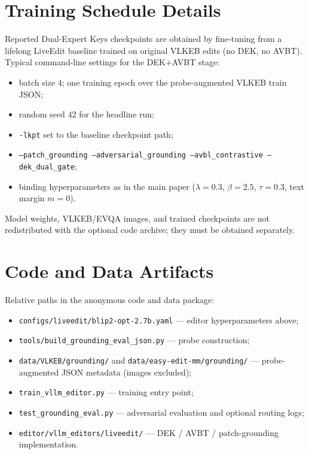 \documentclass[letterpaper]{article}
\begin{document}
\section{Training Schedule Details}
Reported Dual-Expert Keys checkpoints are obtained by fine-tuning from a lifelong LiveEdit baseline trained on original VLKEB edits (no DEK, no AVBT).
Typical command-line settings for the DEK+AVBT stage:
\begin{itemize}
\item batch size $4$; one training epoch over the probe-augmented VLKEB train JSON;
\item random seed $42$ for the headline run;
\item \texttt{-lkpt} set to the baseline checkpoint path;
\item \texttt{--patch\_grounding --adversarial\_grounding --avbl\_contrastive --dek\_dual\_gate};
\item binding hyperparameters as in the main paper ($\lambda{=}0.3$, $\beta{=}2.5$, $\tau{=}0.3$, text margin $m{=}0$).
\end{itemize}
Model weights, VLKEB/EVQA images, and trained checkpoints are not redistributed with the optional code archive; they must be obtained separately.

\section{Code and Data Artifacts}
Relative paths in the anonymous code and data package:
\begin{itemize}
\item \texttt{configs/liveedit/blip2-opt-2.7b.yaml} --- editor hyperparameters above;
\item \texttt{tools/build\_grounding\_eval\_json.py} --- probe construction;
\item \texttt{data/VLKEB/grounding/} and \texttt{data/easy-edit-mm/grounding/} --- probe-augmented JSON metadata (images excluded);
\item \texttt{train\_vllm\_editor.py} --- training entry point;
\item \texttt{test\_grounding\_eval.py} --- adversarial evaluation and optional routing logs;
\item \texttt{editor/vllm\_editors/liveedit/} --- DEK / AVBT / patch-grounding implementation.
\end{itemize}
\end{document}
